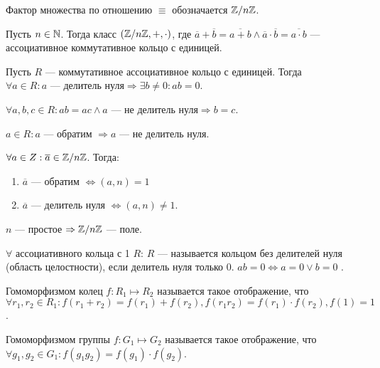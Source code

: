 \begin{definition}
    Фактор множества по отношению $\equiv$ обозначается  $\mathbb{Z} / n\mathbb{Z}$.
\end{definition}
\begin{theorem}
    Пусть $n \in \mathbb{N}$. Тогда класс $(\mathbb{Z} / n\mathbb{Z}, +, \cdot)$, где $\overline{a}+\overline{b} = \overline{a+b} \land \overline{a} \cdot \overline{b} = \overline{a \cdot b}$ --- ассоциативное коммутативное кольцо с единицей.
\end{theorem}
\begin{definition}
    Пусть $R$ --- коммутативное ассоциативное кольцо с единицей. Тогда  $\forall a \in R: a\text{ --- делитель нуля} \Rightarrow \exists b \neq 0: ab = 0$.
\end{definition}
\begin{lemma}
    $\forall a, b, c \in R\!: ab = ac \land a\text{ --- не делитель нуля} \Rightarrow b = c$. 
\end{lemma}
\begin{lemma}
    $a \in R\!: a$ --- обратим $\Rightarrow a$ --- не делитель нуля.
\end{lemma}
\begin{theorem}
    $\forall a \in Z: \overline{a} \in \mathbb{Z} / n\mathbb{Z}$. Тогда:  
    \begin{enumerate}
        \item $\overline{a}$ --- обратим $\iff (a, n) = 1$
        \item  $\overline{a}$ --- делитель нуля $\iff (a, n) \neq 1$.
    \end{enumerate}
\end{theorem}
\begin{consequence}
    $n$ --- простое  $\Rightarrow \mathbb{Z} / n\mathbb{Z}$ --- поле.
\end{consequence}
\begin{definition}
    $\forall $ ассоциативного кольца с 1 $R$:  $R$ --- называется кольцом без делителей нуля (область целостности), если делитель нуля только 0.  $ab = 0 \iff a = 0 \lor b = 0$  .
\end{definition}
 \begin{definition}
     Гомоморфизмом колец $f: R_1 \mapsto R_2$ называется такое отображение, что $\forall r_1, r_2 \in R_1: f(r_1 + r_2) = f(r_1) + f(r_2), f(r_1r_2)=f(r_1)\cdot f(r_2), f(1) = 1$.
\end{definition}
\begin{definition}
    Гомоморфизмом группы $f: G_1 \mapsto G_2$ называется такое отображение, что $\forall g_1, g_2 \in G_1: f(g_1g_2) = f(g_1) \cdot f(g_2)$.
\end{definition}
